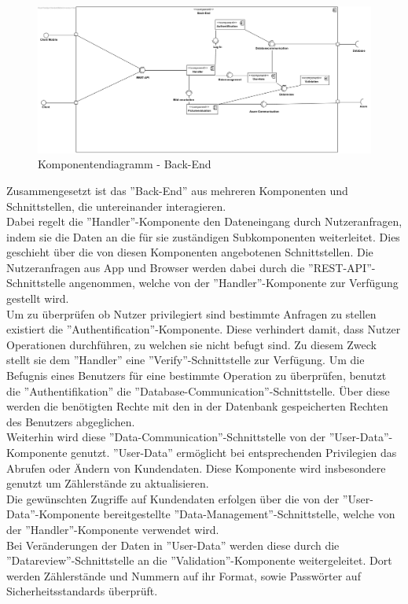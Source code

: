 \begin{figure}[h]
\includegraphics[width=15cm]{img/diagrams/component-back-end}
\caption{Komponentendiagramm - Back-End} 
\end{figure}
Zusammengesetzt ist das ''Back-End'' aus mehreren Komponenten und Schnittstellen, die untereinander interagieren.\\
Dabei regelt die ''Handler''-Komponente den Dateneingang durch Nutzeranfragen, indem sie die Daten an die für sie zuständigen Subkomponenten weiterleitet. Dies geschieht über die von diesen Komponenten angebotenen Schnittstellen. Die Nutzeranfragen aus App und Browser werden dabei durch die ''REST-API''-Schnittstelle angenommen, welche von der ''Handler''-Komponente zur Verfügung gestellt wird.\\
Um zu überprüfen ob Nutzer privilegiert sind bestimmte Anfragen zu stellen existiert die ''Authentification''-Komponente. Diese verhindert damit, dass Nutzer Operationen durchführen, zu welchen sie nicht befugt sind. Zu diesem Zweck stellt sie dem ''Handler'' eine ''Verify''-Schnittstelle zur Verfügung. Um die Befugnis eines Benutzers für eine bestimmte Operation zu überprüfen, benutzt die ''Authentifikation'' die ''Database-Communication''-Schnittstelle. Über diese werden die benötigten Rechte mit den in der Datenbank gespeicherten Rechten des Benutzers abgeglichen.\\
Weiterhin wird diese ''Data-Communication''-Schnittstelle von der ''User-Data''-Komponente genutzt. ''User-Data'' ermöglicht bei entsprechenden Privilegien das Abrufen oder Ändern von Kundendaten. Diese Komponente wird insbesondere genutzt um Zählerstände zu aktualisieren.\\
Die gewünschten Zugriffe auf Kundendaten erfolgen über die von der ''User-Data''-Komponente bereitgestellte ''Data-Management''-Schnittstelle, welche von der ''Handler''-Komponente verwendet wird.\\
Bei Veränderungen der Daten in ''User-Data'' werden diese durch die ''Datareview''-Schnittstelle an die ''Validation''-Komponente weitergeleitet. Dort werden Zählerstände und Nummern auf ihr Format, sowie Passwörter auf Sicherheitsstandards überprüft.\\

